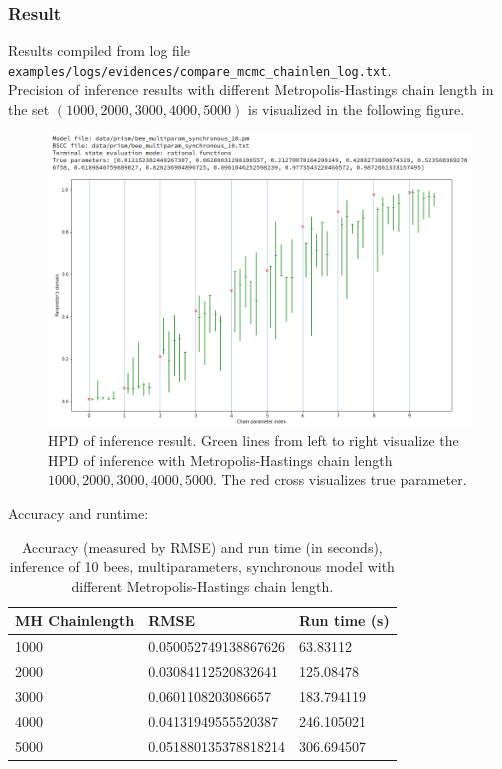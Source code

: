 \documentclass[12pt]{article}
\theoremstyle{definition}
\begin{document}
\subsubsection{Result}
Results compiled from log file \texttt{examples/logs/evidences/compare\_mcmc\_chainlen\_log.txt}.\\
Precision of inference results with different Metropolis-Hastings chain length in
the set $(1000, 2000, 3000, 4000, 5000)$ is visualized in the following figure. 
\begin{figure}[H]
  \centering
  \includegraphics[width=\textwidth,keepaspectratio]{figures/compare_mcmc_chainlength.png}
  \caption{HPD of inference result. Green lines from left to right visualize the
  HPD of inference with Metropolis-Hastings chain length $1000, 2000, 3000,
  4000, 5000$. The red cross visualizes true parameter.}
\end{figure}
Accuracy and runtime:
\begin{table}[H]
  \begin{tabular}{|l|l|l|}
    \hline
    MH Chainlength & RMSE                 & Run time (s) \\ \hline
    1000           & 0.050052749138867626 & 63.83112     \\ \hline
    2000           & 0.03084112520832641  & 125.08478    \\ \hline
    3000           & 0.0601108203086657   & 183.794119   \\ \hline
    4000           & 0.04131949555520387  & 246.105021   \\ \hline
    5000           & 0.051880135378818214 & 306.694507   \\ \hline
  \end{tabular}
  \caption{Accuracy (measured by RMSE) and run time (in seconds), inference of
    10 bees, multiparameters, synchronous model with different
    Metropolis-Hastings chain length.}
\end{table}
\end{document}
